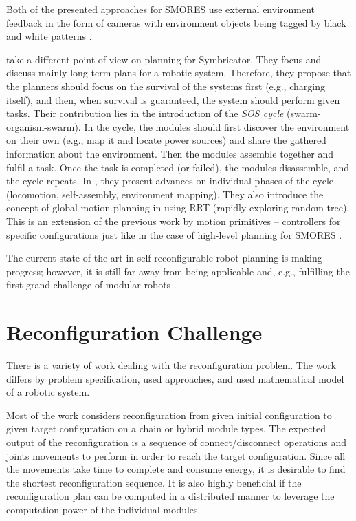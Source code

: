 Both of the presented approaches for SMORES use external environment feedback
in the form of cameras with environment objects being tagged by black and white
patterns \cite{DBLP:journals/scirobotics/JingTYKC18}.

\textcite{DBLP:conf/syscon/LeviMRKVSLC14} take a different point of view on
planning for Symbricator. They focus and discuss mainly long-term plans for a
robotic system. Therefore, they propose that the planners should focus on
the survival of the systems first (e.g., charging itself), and then, when
survival is guaranteed, the system should perform given tasks. Their
contribution lies in the introduction of the \emph{SOS cycle}
(swarm-organism-swarm). In the cycle, the modules should first discover the
environment on their own (e.g., map it and locate power sources) and
share the gathered information about the environment. Then the modules assemble
together and fulfil a task. Once the task is completed (or failed), the modules
disassemble, and the cycle repeats. In \cite{DBLP:conf/syscon/LeviMRKVSLC14},
they present advances on individual phases of the cycle (locomotion,
self-assembly, environment mapping). They also introduce the concept of global
motion planning in \cite{DBLP:conf/icra/VonasekSKP13} using RRT
(rapidly-exploring random tree). This is an extension of the previous work
\cite{DBLP:conf/taros/VonasekKP12} by motion primitives -- controllers for
specific configurations just like in the case of high-level planning for SMORES
\cite{DBLP:journals/arobots/JingTYK18}.

The current state-of-the-art in self-reconfigurable robot planning is making
progress; however, it is still far away from being applicable and, e.g.,
fulfilling the first grand challenge of modular robots
\cite{DBLP:journals/corr/abs-1108-5543}.

\section{Reconfiguration Challenge}\label{sec:chal-reconfig}

There is a variety of work dealing with the reconfiguration problem. The work
differs by problem specification, used approaches, and used mathematical model
of a robotic system.

Most of the work considers reconfiguration from given initial configuration to
given target configuration on a chain or hybrid module types. The expected
output of the reconfiguration is a sequence of connect/disconnect operations and
joints movements to perform in order to reach the target configuration. Since
all the movements take time to complete and consume energy, it is desirable to
find the shortest reconfiguration sequence. It is also highly beneficial if the
reconfiguration plan can be computed in a distributed manner to leverage the
computation power of the individual modules.

